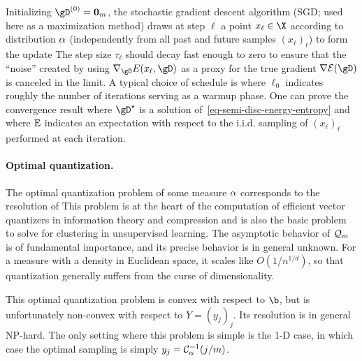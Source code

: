 Initializing $\gD^{(0)} = \zeros_{m}$, the stochastic gradient descent algorithm (SGD; used here as a maximization method) draws at step $\ell$ a point $x_\ell \in \X$ according to distribution $\alpha$ (independently from all past and future samples $(x_\ell)_\ell$) to form the update
The step size $\tau_\ell$ should decay fast enough to zero to ensure that the ``noise'' created by using  $\nabla_{\gD} E(x_\ell,\gD)$ as a proxy for the true gradient $\nabla \Ee(\gD)$ is canceled in the limit. 
%
A typical choice of schedule is 
where $\ell_0$ indicates roughly the number of iterations serving as a warmup phase.
%
One can prove the convergence result
where $\gD^\star$ is a solution of~\eqref{eq-semi-disc-energy-entropy} and where $\mathbb{E}$ indicates an expectation with respect to the i.i.d. sampling of $(x_\ell)_\ell$ performed at each iteration.
%


\paragraph{Optimal quantization.}

The optimal quantization problem of some measure $\alpha$ corresponds to the resolution of
This problem is at the heart of the computation of efficient vector quantizers in information theory and compression and is also the basic problem to solve for clustering in unsupervised learning.
%
The asymptotic behavior of $\mathcal{Q}_m$ is of fundamental importance, and its precise behavior is in general unknown. For a measure with a density in Euclidean space, it scales like $O(1/n^{1/d})$, so that quantization generally suffers from the curse of dimensionality.

This optimal quantization problem is convex with respect to $\b$, but is unfortunately non-convex with respect to $Y=(y_j)_j$. Its resolution is in general NP-hard.
%
The only setting where this problem is simple is the 1-D case, in which case the optimal sampling is simply $y_j = \mathcal{C}_\alpha^{-1}(j/m)$. 

